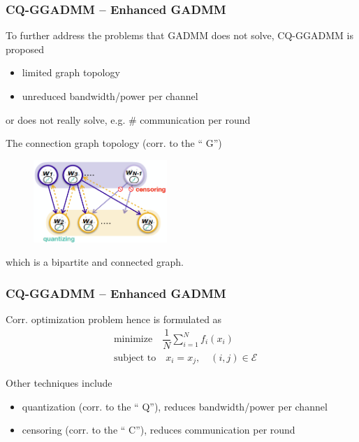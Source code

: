 \begin{frame}
\frametitle{CQ-GGADMM -- Enhanced GADMM}

To further address the problems that GADMM does not solve, {\color{red}CQ-G}GADMM \cite{issaid2020cq-ggadmm} is proposed

\begin{itemize}
    \item limited graph topology
    \item unreduced bandwidth/power per channel
\end{itemize}
or does not really solve, e.g. \# communication per round

\pause
\vspace{0.8em}

The connection graph topology (corr. to the ``{\color{red} G}'')
\begin{figure}[H]
    \centering
    \includegraphics[width=0.45\textwidth,keepaspectratio]{images/CQ-GGADMM.png}
\end{figure}
which is a {\color{red} bipartite} and connected graph.

\end{frame}


\begin{frame}
\frametitle{CQ-GGADMM -- Enhanced GADMM}

Corr. optimization problem hence is formulated as
\begin{align*}
    & \text{minimize} \quad \dfrac{1}{N} \sum\limits_{i=1}^N f_i(x_i) \\
    & \text{subject to} \quad x_i = x_{j}, \quad (i,j) \in \mathscr{E}
\end{align*}

\pause
\vspace{0.8em}

Other techniques include
\begin{itemize}
    \item quantization (corr. to the ``{\color{red} Q}''), reduces bandwidth/power per channel
    \item censoring (corr. to the ``{\color{red} C}''), reduces communication per round
\end{itemize}

\end{frame}

